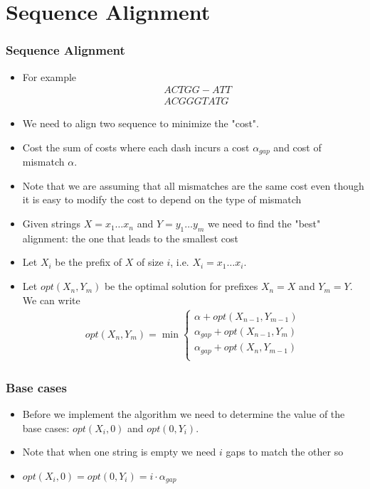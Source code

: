 \documentclass{beamer}
\begin{document}
\section{Sequence Alignment}
\begin{frame}
  \frametitle{Sequence Alignment}
  

\begin{itemize}
\item For example
  \begin{align*}
    &ACTGG\!-\!ATT\\
    &ACGGGTATG
  \end{align*}
\item We need to align two sequence to minimize the "cost". 
\item Cost the sum of costs where each dash incurs a cost $\alpha_{gap}$ and cost of mismatch $\alpha$. 
\item Note that we are assuming that all mismatches are the same cost even though it is easy to modify the cost to depend on the type of mismatch
\end{itemize}
\end{frame}
\begin{frame}
  \begin{itemize}
  \item Given strings $X=x_1\ldots x_n$ and $Y=y_1\ldots y_m$ we need to find the "best" alignment: the one that leads to the smallest cost
  \item Let $X_i$ be the prefix of $X$ of size $i$, i.e. $X_i=x_1\ldots x_i$.
  \item Let $opt(X_n,Y_m)$ be the optimal solution for prefixes $X_n=X$ and $Y_m=Y$. We can write
    \begin{align*}
      opt(X_n,Y_m)=\min
    \begin{cases}
     \alpha+ opt(X_{n-1},Y_{m-1})\\
     \alpha_{gap}+ opt(X_{n-1},Y_m)\\
     \alpha_{gap}+ opt(X_{n},Y_{m-1})\\
   \end{cases}
    \end{align*}
  \end{itemize}
\end{frame}
\begin{frame}
  \frametitle{Base cases}
  \begin{itemize}
  \item Before we implement the algorithm we need to determine the value of the base cases: $opt(X_i,0)$ and $opt(0,Y_i)$.
  \item Note that when one string is empty we need $i$ gaps to match the other so
  \item $opt(X_i,0)=opt(0,Y_i)=i\cdot\alpha_{gap}$
  \end{itemize}
\end{frame}
\end{document}
